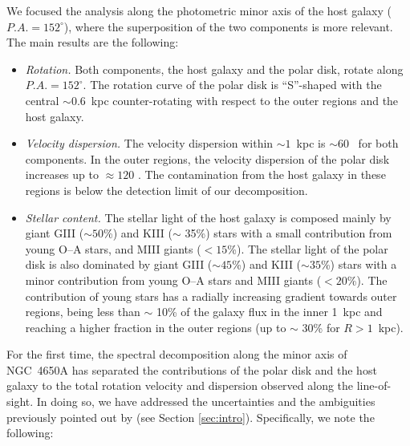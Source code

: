 \documentclass{aa}
\begin{document}
We focused the analysis along the photometric minor axis of the host
galaxy ($P.A. = 152^{\circ}$), where the superposition of the two
components is more relevant.  The main results are the following:

\begin{itemize}

\item {\it Rotation.} Both components, the host galaxy and
  the polar disk, rotate along $P.A. = 152^{\circ}$. The rotation
  curve of the polar disk is ``S''-shaped with the central $\sim
  0.6$~kpc counter-rotating with respect to the outer regions and the
  host galaxy.

\item {\it Velocity dispersion.} The velocity dispersion within $\sim
  1$~kpc is $\sim 60$ \kms\ for both components. In the outer regions,
  the velocity dispersion of the polar disk increases up to $\approx
  120$ \kms.  The contamination from the host galaxy in these regions
  is below the detection limit of our decomposition.

\item {\it Stellar content.} The stellar light of the host galaxy is
  composed mainly by giant GIII ($\sim 50$\%) and KIII ($\sim$ 35\%)
  stars with a small contribution from young O--A stars, and MIII
  giants ($<15$\%). The stellar light of the polar disk is also
  dominated by giant GIII ($\sim 45$\%) and KIII ($\sim 35$\%) stars
  with a minor contribution from young O--A stars and MIII giants
  ($<20$\%). The contribution of young stars has a radially increasing
  gradient towards outer regions, being less than $\sim$ 10\% of the
  galaxy flux in the inner 1~kpc and reaching a higher fraction in
  the outer regions (up to $\sim$ 30\% for $R> 1$~kpc).
\end{itemize}

For the first time, the spectral decomposition along the minor axis of
NGC~4650A has separated the contributions of the polar disk and the
host galaxy to the total rotation velocity and dispersion observed
along the line-of-sight. In doing so, we have addressed the
uncertainties and the ambiguities previously pointed out by
\citet{Iodice+06} (see Section \ref{sec:intro}). Specifically, we note
the following:
\end{document}
